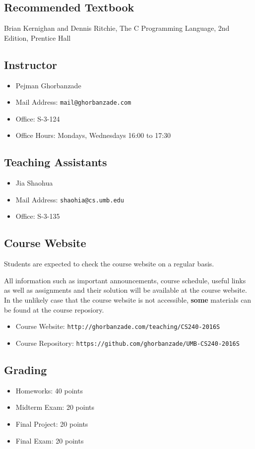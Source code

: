 \documentclass[12pt,letterpaper,twoside]{article}
\begin{document}
\subsection*{Recommended Textbook}
Brian Kernighan and Dennis Ritchie, The C Programming Language, 2nd Edition, Prentice Hall

\subsection*{Instructor}
\begin{itemize}
\item[] Pejman Ghorbanzade
\item[] Mail Address: \texttt{mail@ghorbanzade.com}
\item[] Office: S-3-124
\item[] Office Hours: Mondays, Wednesdays 16:00 to 17:30
\end{itemize}

\subsection*{Teaching Assistants}
\begin{itemize}
\item[] Jia Shaohua
\item[] Mail Address: \texttt{shaohia@cs.umb.edu}
\item[] Office: S-3-135
\end{itemize}

\subsection*{Course Website}
Students are expected to check the course website on a regular basis.

All information such as important announcements, course schedule, useful links as well as assignments and their solution will be available at the course website.
In the unlikely case that the course website is not accessible, \textbf{some} materials can be found at the course reposiory.

\begin{itemize}
\item[] Course Website: \texttt{\footnotesize http://ghorbanzade.com/teaching/CS240-2016S}
\item[] Course Repository: \texttt{\footnotesize https://github.com/ghorbanzade/UMB-CS240-2016S}
\end{itemize}

\subsection*{Grading}
\begin{itemize}
\item[] Homeworks: 40 points
\item[] Midterm Exam: 20 points
\item[] Final Project: 20 points
\item[] Final Exam: 20 points
\end{itemize}
\end{document}
